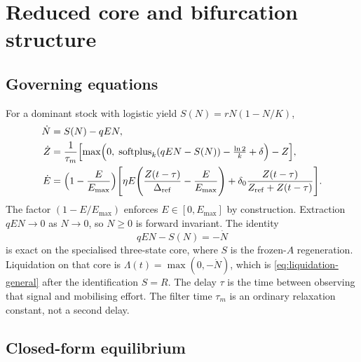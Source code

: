 \documentclass[11pt]{article}
\theoremstyle{definition}
\begin{document}
\section{Reduced core and bifurcation structure}
\label{sec:core}

\subsection{Governing equations}
For a dominant stock with logistic yield $S(N)=rN(1-N/K)$,
\begin{align}
\dot N &= S(N)-qEN, \label{eq:stock-core}\\
\dot Z &= \frac{1}{\tau_m}\Bigl[\max\Bigl(0,\;\mathrm{softplus}_k(qEN-S(N))-\tfrac{\ln 2}{k}+\delta\Bigr)-Z\Bigr], \label{eq:Z-core}\\
\dot E &= \Bigl(1-\frac{E}{E_{\max}}\Bigr)\Biggl[\eta E\Biggl(\frac{Z(t-\tau)}{\Delta_{\mathrm{ref}}}-\frac{E}{E_{\max}}\Biggr)+\delta_0\frac{Z(t-\tau)}{Z_{\mathrm{ref}}+Z(t-\tau)}\Biggr].
\label{eq:effort-core}
\end{align}
The factor $(1-E/E_{\max})$ enforces $E\in[0,E_{\max}]$ by construction. Extraction $qEN\to 0$ as $N\to 0$, so $N\ge 0$ is forward invariant. The identity
\begin{equation}
qEN-S(N)=-\dot N
\label{eq:deficit-identity}
\end{equation}
is exact on the specialised three-state core, where $S$ is the frozen-$A$ regeneration. Liquidation on that core is $\Lambda(t)=\max(0,-\dot N)$, which is \eqref{eq:liquidation-general} after the identification $S=R$. The delay $\tau$ is the time between observing that signal and mobilising effort. The filter time $\tau_m$ is an ordinary relaxation constant, not a second delay.

\subsection{Closed-form equilibrium}
\end{document}
